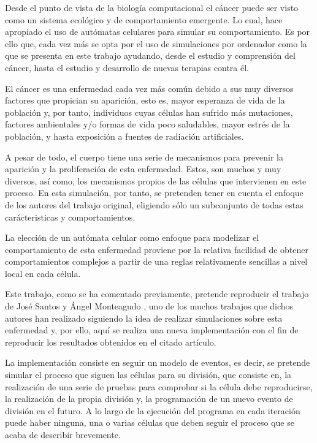 Desde el punto de vista de la biología computacional el cáncer puede ser visto como un sistema ecológico y de comportamiento emergente.
Lo cual, hace apropiado el uso de autómatas celulares para simular su comportamiento. Es por ello que, cada vez más se opta por el uso
de simulaciones por ordenador como la que se presenta en este trabajo ayudando, desde el estudio y comprensión del cáncer, hasta
el estudio y desarrollo de nuevas terapias contra él.

El cáncer es una enfermedad cada vez más común debido a sus muy diversos factores que propician su aparición, esto es,
mayor esperanza de vida de la población y, por tanto, individuos cuyas células han sufrido más mutaciones, factores ambientales y/o
formas de vida poco saludables, mayor estrés de la población, y hasta exposición a fuentes de radiación artificiales.

A pesar de todo, el cuerpo tiene una serie de mecanismos para prevenir la aparición y la proliferación de esta enfermedad. Estos,
son muchos y muy diversos, así como, los mecanismos propios de las células que intervienen en este proceso. En esta simulación, por tanto,
se pretenden tener en cuenta el enfoque de los autores del trabajo original, eligiendo sólo un subconjunto de todas estas
carácteristicas y comportamientos.

La elección de un autómata celular como enfoque para modelizar el comportamiento de esta enfermedad proviene por la relativa
facilidad de obtener comportamientos complejos a partir de una reglas relativamente sencillas a nivel local en cada célula.

Este trabajo, como se ha comentado previamente, pretende reproducir el trabajo de José Santos y Ángel Monteagudo \cite{jsantos-amonteagudo-1-2014},
uno de los muchos trabajos que dichos autores han realizado siguiendo la idea de realizar simulaciones sobre esta enfermedad y, por ello, aquí
se realiza una nueva implementación con el fin de reproducir los resultados obtenidos en el citado artículo.

La implementación consiste en seguir un modelo de eventos, es decir, se pretende simular el proceso que siguen las células para su división, que
consiste en, la realización de una serie de pruebas para comprobar si la célula debe reproducirse, la realización de la propia división y,
la programación de un nuevo evento de división en el futuro. A lo largo de la ejecución del programa en cada iteración puede haber ninguna, una o
varias células que deben seguir el proceso que se acaba de describir brevemente.

